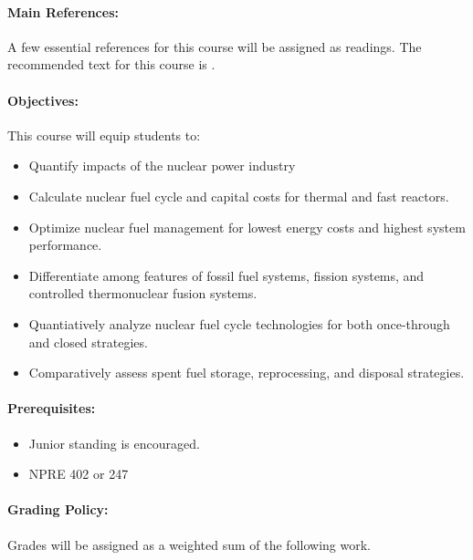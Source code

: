 \documentclass[11pt, a4paper]{article}
\begin{document}
\paragraph{Main References:}
A few essential references for this course will be assigned as readings. The 
recommended text for this course is \cite{tsoulfanidis_nuclear_2013}.

\renewcommand{\refname}{\normalfont\selectfont\normalsize}


\paragraph{Objectives:} 

This course will equip students to:

\begin{itemize}
\item Quantify impacts of the nuclear power industry
\item Calculate nuclear fuel cycle and capital costs for thermal and fast reactors.
\item Optimize nuclear fuel management for lowest energy costs and highest system performance.
\item Differentiate among features of fossil fuel systems, fission systems, and controlled thermonuclear fusion systems.
\item Quantiatively analyze nuclear fuel cycle technologies for both once-through and closed strategies.
\item Comparatively assess spent fuel storage, reprocessing, and disposal strategies.
\end{itemize}

\paragraph{Prerequisites:} 
\begin{itemize}
        \item Junior standing is encouraged.
\item NPRE 402 or 247
\end{itemize}

\paragraph{Grading Policy:} Grades will be assigned as a weighted sum of the 
following work.
\end{document}
